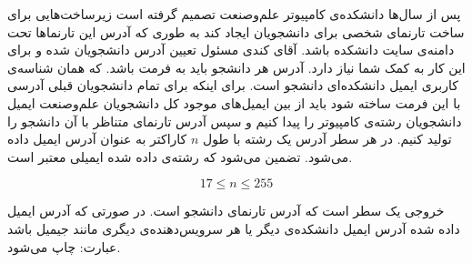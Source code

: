 \begin{problem}{}
{}{}
{}{}{}
پس از سال‌ها دانشکده‌ی کامپیوتر علم‌وصنعت تصمیم گرفته است زیرساخت‌هایی برای ساخت تارنمای شخصی برای دانشجویان ایجاد کند به طوری که آدرس این تارنماها تحت دامنه‌ی سایت دانشکده باشد. آقای کندی مسئول تعیین آدرس دانشجویان شده و برای این کار به کمک شما نیاز دارد. آدرس هر دانشجو باید به فرمت
  باشد. که
    همان شناسه‌ی کاربری ایمیل دانشکده‌ای دانشجو است. برای اینکه برای تمام دانشجویان قبلی آدرسی با این فرمت ساخته شود باید از بین ایمیل‌های موجود کل دانشجویان علم‌و‌صنعت ایمیل دانشجویان رشته‌ی کامپیوتر را پیدا کنیم و سپس آدرس تارنمای متناظر با آن دانشجو را تولید کنیم.
    \InputFile
 در هر سطر آدرس یک رشته با طول $n$ کاراکتر به عنوان آدرس ایمیل داده می‌شود. تضمین می‌شود که رشته‌ی داده شده ایمیلی معتبر است.

    $$ 17 \le n \le 255 $$


    \OutputFile

خروجی یک سطر است که آدرس تارنمای دانشجو است. در صورتی که آدرس ایمیل داده شده  آدرس ایمیل دانشکده‌ی دیگر یا هر سرویس‌دهنده‌ی دیگری مانند جیمیل باشد عبارت:
چاپ می‌شود.
    \Examples

    \Example
    \begin{example}
    \end{example}

    \Example
    \begin{example}
    \end{example}

    \Example
    \begin{example}
    \end{example}


\end{problem}
